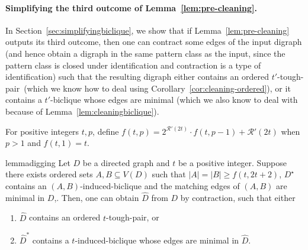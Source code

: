 \documentclass[a4paper,11pt]{article}
\theoremstyle{plain}
\newtheorem{identification rule}{Identification Rule}
\theoremstyle{definition}
\theoremstyle{remark}
\newcommand{\toughpair}{tough-pair}
\begin{document}
\paragraph*{Simplifying the third outcome of Lemma~\ref{lem:pre-cleaning}.} In Section~\ref{sec:simplifyingbiclique}, we show that if Lemma~\ref{lem:pre-cleaning} outputs its third outcome, then one can contract some edges of the input digraph (and hence obtain a digraph in the same pattern class as the input, since the pattern class is closed under identification and contraction is a type of identification) such that the resulting digraph either contains an ordered $t'$-\toughpair\ (which we know how to deal using Corollary~\ref{cor:cleaning-ordered}), or it contains a $t'$-biclique whose edges are minimal (which we also know to deal with because of Lemma~\ref{lem:cleaningbiclique}).

For positive integers $t,p$, define $f(t,p) = 2^{\mathcal{R}'(2t)} \cdot f(t,p-1) + \mathcal{R}'(2t)$ when $p >1$ and $f(t,1)=t$.

\begin{restatable}{lemma}{digging}\label{lem:digging}
Let $D$ be a directed graph and $t$ be a positive integer.  
Suppose there exists ordered sets
$A,B \subseteq V(D)$ such that $|A|=|B|\geq f(t,2t+2)$, 
$D^{\star}$ contains an $(A,B)$-induced-biclique and the matching edges of $(A,B)$ are minimal in $D$,.
Then, one can obtain $\widehat{D}$ from $D$ by contraction, such that 
either
\begin{enumerate}
\item $\widehat{D}$ contains an ordered $t$-\toughpair, or
\item $\widehat{D}^*$ contains a $t$-induced-biclique whose edges are minimal in $\widehat{D}$.
\end{enumerate}
\end{restatable}
\end{document}
